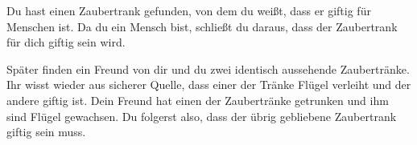 \documentclass[../../main.tex]{subfiles}
\begin{document}
    
    
    \begin{example}{}
        Du hast einen Zaubertrank gefunden, von dem du weißt, dass er giftig für Menschen ist. Da du ein Mensch bist, schließt du daraus, dass der Zaubertrank für dich giftig sein wird.
        
        Später finden ein Freund von dir und du zwei identisch aussehende Zaubertränke. Ihr wisst wieder aus sicherer Quelle, dass einer der Tränke Flügel verleiht und der andere giftig ist. Dein Freund hat einen der Zaubertränke getrunken und ihm sind Flügel gewachsen. Du folgerst also, dass der übrig gebliebene Zaubertrank giftig sein muss.
    \end{example}
    
\end{document}
